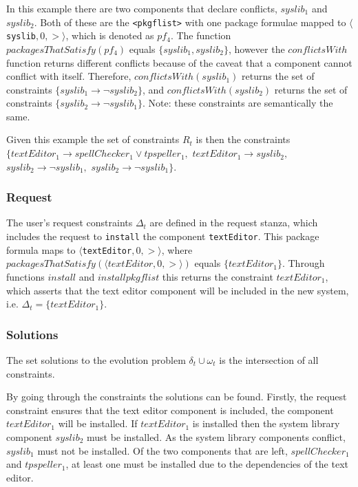 In this example there are two components that declare conflicts, $syslib_1$ and $syslib_2$.
Both of these are the \verb+<pkgflist>+ with one package formulae mapped to  $\langle $\verb+syslib+$,0,>\rangle$, which is denoted as $pf_4$.
The function $packagesThatSatisfy(pf_4)$ equals $\{ syslib_1,syslib_2 \}$,
however the $conflictsWith$ function returns different conflicts because of the caveat that a component cannot conflict with itself.
Therefore, $conflictsWith(syslib_1)$ returns the set of constraints $\{syslib_1 \rightarrow \neg syslib_2\}$,
and $conflictsWith(syslib_2)$ returns the set of constraints $\{syslib_2 \rightarrow \neg syslib_1\}$.
Note: these constraints are semantically the same.

Given this example the set of constraints $R_t$ is then the constraints
$\{ textEditor_1 \rightarrow spellChecker_1 \vee tpspeller_1,$ 
$textEditor_1 \rightarrow syslib_2,$ 
$syslib_2 \rightarrow \neg syslib_1,$   
$syslib_2 \rightarrow \neg syslib_1\}$.

\subsubsection{Request}
The user's request constraints $\Delta_t$ are defined in the request stanza, which includes the request to \verb+install+ the component \verb+textEditor+. 
This package formula maps to $\langle $\verb+textEditor+$,0,>\rangle$, where $packagesThatSatisfy(\langle textEditor,0,>\rangle)$ equals $\{textEditor_1\}$.
Through functions $install$ and $installpkgflist$ this returns the constraint $textEditor_1$,
which asserts that the text editor component will be included in the new system, i.e. $\Delta_t = \{textEditor_1\}$.

\subsubsection{Solutions}
The set solutions to the evolution problem $\delta_t \cup \omega_t$ is the intersection of all constraints.

By going through the constraints the solutions can be found.
Firstly, the request constraint ensures that the text editor component is included, the component $textEditor_1$ will be installed.
If $textEditor_1$ is installed then the system library component $syslib_2$ must be installed.
As the system library components conflict, $syslib_1$ must not be installed.
Of the two components that are left, $spellChecker_1$ and $tpspeller_1$, at least one must be installed due to the dependencies of the text editor.

